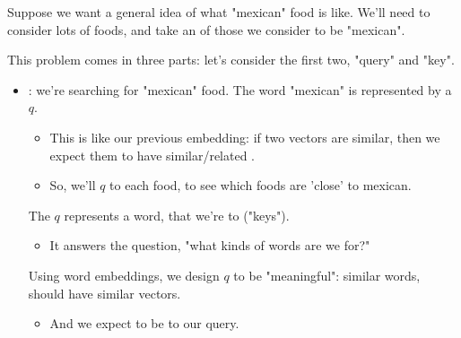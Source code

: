         Suppose we want a general idea of what "mexican" food is like. We'll need to consider lots of foods, and take an  of those we consider to be "mexican".

        \phantom{}

        This problem comes in three parts: let's consider the first two, "query" and "key".

        \begin{itemize}
            \item {}: we're searching for "mexican" food. The word "mexican" is represented by a  $q$. 
            
            \begin{itemize}
                \item This is like our previous  embedding: if two vectors are similar, then we expect them to have similar/related .
                \item So, we'll  $q$ to each food, to see which foods are 'close' to mexican.\\
            \end{itemize}

            \begin{definition}
                The  $q$ represents a word, that we're  to  ("keys").

                \begin{itemize}
                    \item It answers the question, "what kinds of words are we  for?" 
                \end{itemize}

                Using word embeddings, we design $q$ to be "meaningful": similar words, should have similar vectors.
                
                \begin{itemize}
                    \item And we expect  to be  to our query.
                \end{itemize} 
            \end{definition}


\end{itemize}
